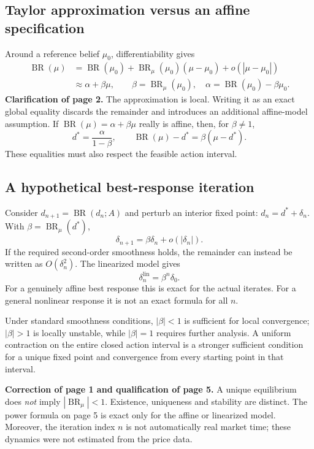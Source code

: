 \documentclass[11pt,a4paper]{article}
\newcommand{\BR}{\operatorname{BR}}
\begin{document}
\subsection{Taylor approximation versus an affine specification}
Around a reference belief $\mu_0$, differentiability gives
\begin{align}
 \BR(\mu)&=\BR(\mu_0)+\BR_\mu(\mu_0)(\mu-\mu_0)
              +o(|\mu-\mu_0|)\\
         &\approx \alpha+\beta\mu,\qquad
 \beta=\BR_\mu(\mu_0),\quad
 \alpha=\BR(\mu_0)-\beta\mu_0.
\end{align}
\textbf{Clarification of page 2.} The approximation is local. Writing it as
an exact global equality discards the remainder and introduces an additional
affine-model assumption. If $\BR(\mu)=\alpha+\beta\mu$ really is affine,
then, for $\beta\ne1$,
\begin{equation}
 d^*=\frac{\alpha}{1-\beta},\qquad
 \BR(\mu)-d^*=\beta(\mu-d^*).
\end{equation}
These equalities must also respect the feasible action interval.

\subsection{A hypothetical best-response iteration}
Consider $d_{n+1}=\BR(d_n;A)$ and perturb an interior fixed point:
$d_n=d^*+\delta_n$. With $\beta=\BR_\mu(d^*)$,
\begin{equation}
 \delta_{n+1}=\beta\delta_n+o(|\delta_n|). \label{eq:local}
\end{equation}
If the required second-order smoothness holds, the remainder can instead be
written as $O(\delta_n^2)$. The linearized model gives
\[
 \delta_n^{\mathrm{lin}}=\beta^n\delta_0.
\]
For a genuinely affine best response this is exact for the actual iterates.
For a general nonlinear response it is not an exact formula for all $n$.

Under standard smoothness conditions, $|\beta|<1$ is sufficient for local
convergence; $|\beta|>1$ is locally unstable, while $|\beta|=1$ requires
further analysis. A uniform contraction on the entire closed action interval
is a stronger sufficient condition for a unique fixed point and convergence
from every starting point in that interval.

\textbf{Correction of page 1 and qualification of page 5.} A unique equilibrium
does \emph{not} imply $|\BR_\mu|<1$. Existence, uniqueness and stability
are distinct. The power formula on page 5 is exact only for the affine or
linearized model. Moreover, the iteration index $n$ is not automatically real
market time; these dynamics were not estimated from the price data.
\end{document}
